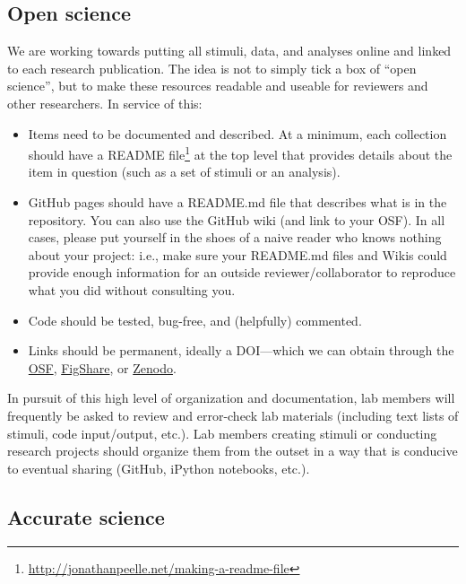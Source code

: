 \documentclass[letterpaper,12pt,oneside]{memoir}
\begin{document}
{\subsection{Open science}

We are working towards putting all stimuli, data, and analyses online and linked to each research publication. The idea is not to simply tick a box of ``open science'', but to make these resources readable and useable for reviewers and other researchers. In service of this:

\begin{itemize}
\item Items need to be documented and described. At a minimum, each collection should have a README file\footnote{\url{http://jonathanpeelle.net/making-a-readme-file}} at the top level that provides details about the item in question (such as a set of stimuli or an analysis).

\item GitHub pages should have a README.md file that describes what is in the repository. You can also use the GitHub wiki (and link to your OSF). In all cases, please put yourself in the shoes of a naive reader who knows nothing about your project: i.e., make sure your README.md files and Wikis  could provide enough information for an outside reviewer/collaborator to reproduce what you did without consulting you.

\item Code should be tested, bug-free, and (helpfully) commented.

\item Links should be permanent, ideally a DOI---which we can obtain through the \href{http://help.osf.io/m/sharing/l/524208-create-dois-and-arks}{OSF}, \href{https://figshare.com/}{FigShare}, or \href{https://zenodo.org/}{Zenodo}.
\end{itemize}

In pursuit of this high level of organization and documentation, lab members will frequently be asked to review and error-check lab materials (including text lists of stimuli, code input/output, etc.). Lab members creating stimuli or conducting research projects should organize them from the outset in a way that is conducive to eventual sharing (GitHub, iPython notebooks, etc.).


\subsection{Accurate science}

}
\end{document}
